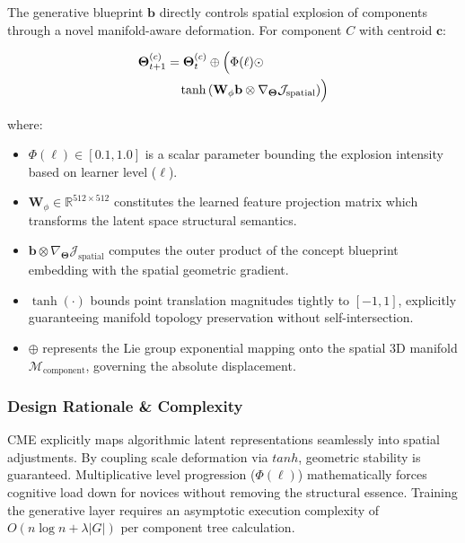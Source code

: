 \documentclass[conference]{IEEEtran}
\begin{document}
The generative blueprint $\mathbf{b}$ directly controls spatial explosion of components through a novel manifold-aware deformation. For component $C$ with centroid $\mathbf{c}$:

\begin{equation}
\begin{split}
\mathbf{\Theta}^{(c)}_{t+1} &= \mathbf{\Theta}^{(c)}_t \oplus \Bigl( \Phi(\ell) \odot \\
&\quad \tanh\left( \mathbf{W}_{\phi} \mathbf{b} \otimes \nabla_{\mathbf{\Theta}} \mathcal{J}_{\text{spatial}} \right) \Bigr)
\end{split}
\label{eq:cme_novel}
\end{equation}

where:
\begin{itemize}
    \item $\Phi(\ell) \in [0.1, 1.0]$ is a scalar parameter bounding the explosion intensity based on learner level ($\ell$).
    \item $\mathbf{W}_{\phi} \in \mathbb{R}^{512 \times 512}$ constitutes the learned feature projection matrix which transforms the latent space structural semantics.
    \item $\mathbf{b} \otimes \nabla_{\mathbf{\Theta}} \mathcal{J}_{\text{spatial}}$ computes the outer product of the concept blueprint embedding with the spatial geometric gradient.
    \item $\tanh(\cdot)$ bounds point translation magnitudes tightly to $[-1, 1]$, explicitly guaranteeing manifold topology preservation without self-intersection.
    \item $\oplus$ represents the Lie group exponential mapping onto the spatial 3D manifold $\mathcal{M}_{\text{component}}$, governing the absolute displacement.
\end{itemize}

\subsubsection{Design Rationale \& Complexity}
CME explicitly maps algorithmic latent representations seamlessly into spatial adjustments. By coupling scale deformation via $tanh$, geometric stability is guaranteed. Multiplicative level progression ($\Phi(\ell)$) mathematically forces cognitive load down for novices without removing the structural essence. Training the generative layer requires an asymptotic execution complexity of $O(n \log n + \lambda |G|)$ per component tree calculation.
\end{document}
